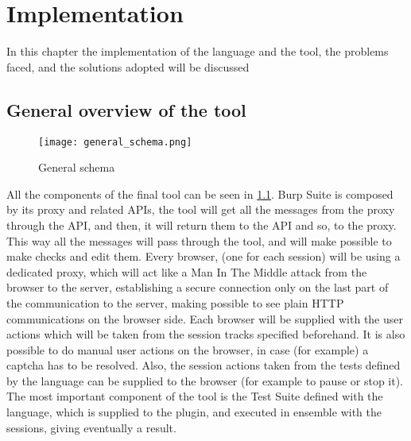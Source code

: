 \chapter{Implementation}
\label{chap:Implementation}
In this chapter the implementation of the language and the tool, the problems faced, and the solutions adopted will be discussed

\section{General overview of the tool}
\begin{figure}
    \texttt{[image: general\_schema.png]}
    \caption{General schema}
    \label{fig:general_schema}
\end{figure}

All the components of the final tool can be seen in \ref{fig:general_schema}. Burp Suite is composed by its proxy and related APIs, the tool will get all the messages from the proxy through the API, and then, it will return them to the API and so, to the proxy. This way all the messages will pass through the tool, and will make possible to make checks and edit them.
Every browser, (one for each session) will be using a dedicated proxy, which will act like a Man In The Middle attack from the browser to the server, establishing a secure connection only on the last part of the communication to the server, making possible to see plain HTTP communications on the browser side. Each browser will be supplied with the user actions which will be taken from the session tracks specified beforehand. It is also possible to do manual user actions on the browser, in case (for example) a captcha has to be resolved. Also, the session actions taken from the tests defined by the language can be supplied to the browser (for example to pause or stop it). The most important component of the tool is the Test Suite defined with the language, which is supplied to the plugin, and executed in ensemble with the sessions, giving eventually a result.

